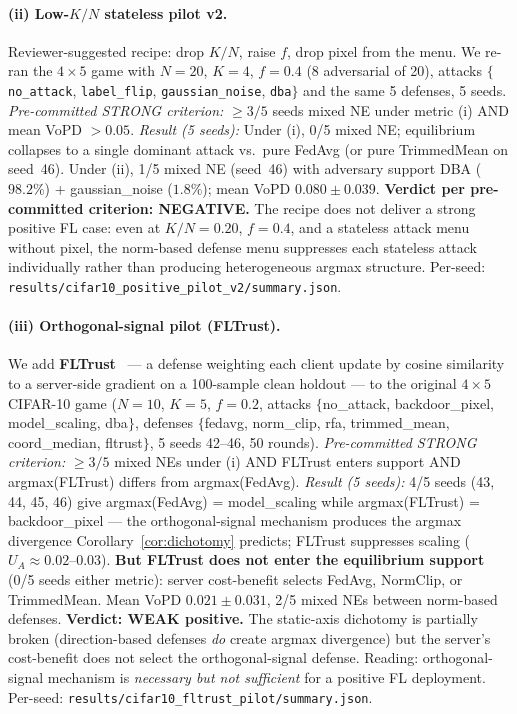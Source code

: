 \documentclass{article}
\begin{document}
\paragraph{(ii) Low-$K/N$ stateless pilot v2.} Reviewer-suggested recipe: drop $K/N$, raise $f$, drop pixel from the menu. We re-ran the $4{\times}5$ game with $N{=}20$, $K{=}4$, $f{=}0.4$ (8 adversarial of 20), attacks $\{$\texttt{no\_attack}, \texttt{label\_flip}, \texttt{gaussian\_noise}, \texttt{dba}$\}$ and the same 5 defenses, 5 seeds. \emph{Pre-committed STRONG criterion:} $\geq 3/5$ seeds mixed NE under metric (i) AND mean VoPD $> 0.05$. \emph{Result (5 seeds):} Under (i), 0/5 mixed NE; equilibrium collapses to a single dominant attack vs.\ pure FedAvg (or pure TrimmedMean on seed~46). Under (ii), 1/5 mixed NE (seed~46) with adversary support DBA ($98.2\%$) + gaussian\_noise ($1.8\%$); mean VoPD $0.080 \pm 0.039$. \textbf{Verdict per pre-committed criterion: NEGATIVE.} The recipe does not deliver a strong positive FL case: even at $K/N{=}0.20$, $f{=}0.4$, and a stateless attack menu without pixel, the norm-based defense menu suppresses each stateless attack individually rather than producing heterogeneous argmax structure. Per-seed: \texttt{results/cifar10\_positive\_pilot\_v2/summary.json}.

\paragraph{(iii) Orthogonal-signal pilot (FLTrust).} We add \textbf{FLTrust}~\citep{cao2021fltrust} --- a defense weighting each client update by cosine similarity to a server-side gradient on a 100-sample clean holdout --- to the original $4{\times}5$ CIFAR-10 game ($N{=}10$, $K{=}5$, $f{=}0.2$, attacks $\{$no\_attack, backdoor\_pixel, model\_scaling, dba$\}$, defenses $\{$fedavg, norm\_clip, rfa, trimmed\_mean, coord\_median, fltrust$\}$, 5 seeds 42--46, 50 rounds). \emph{Pre-committed STRONG criterion:} $\geq 3/5$ mixed NEs under (i) AND FLTrust enters support AND argmax(FLTrust) differs from argmax(FedAvg). \emph{Result (5 seeds):} 4/5 seeds (43, 44, 45, 46) give argmax(FedAvg) = model\_scaling while argmax(FLTrust) = backdoor\_pixel --- the orthogonal-signal mechanism produces the argmax divergence Corollary~\ref{cor:dichotomy} predicts; FLTrust suppresses scaling ($U_A \approx 0.02$--$0.03$). \textbf{But FLTrust does not enter the equilibrium support} (0/5 seeds either metric): server cost-benefit selects FedAvg, NormClip, or TrimmedMean. Mean VoPD $0.021 \pm 0.031$, 2/5 mixed NEs between norm-based defenses. \textbf{Verdict: WEAK positive.} The static-axis dichotomy is partially broken (direction-based defenses \emph{do} create argmax divergence) but the server's cost-benefit does not select the orthogonal-signal defense. Reading: orthogonal-signal mechanism is \emph{necessary but not sufficient} for a positive FL deployment. Per-seed: \texttt{results/cifar10\_fltrust\_pilot/summary.json}.
\end{document}
